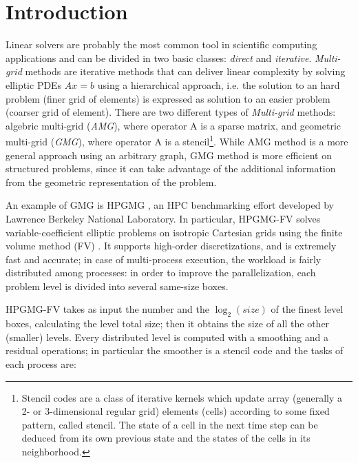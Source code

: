 \documentclass[review]{siamart1116}
\begin{document}
\section{Introduction}\label{sec:introduction}
Linear solvers are probably the most common tool in scientific computing applications and can be divided in two basic classes: \emph{direct} and \emph{iterative}.
\emph{Multi-grid} methods are iterative methods that can deliver linear complexity by solving elliptic PDEs $Ax=b$ using a hierarchical approach, i.e. the solution to an hard problem (finer grid of elements) is expressed as solution to an easier problem (coarser grid of element).
There are two different types of \emph{Multi-grid} methods: algebric multi-grid (\emph{AMG}), where operator A is a sparse matrix, and geometric multi-grid (\emph{GMG}), where operator A is a stencil\footnote{Stencil codes are a class of iterative kernels which update array (generally a 2- or 3-dimensional regular grid) elements (cells) according to some fixed pattern, called stencil. The state of a cell in the next time step can be deduced from its own previous state and the states of the cells in its neighborhood.
}. While AMG method is a more general approach using an arbitrary graph, GMG method is more efficient on structured problems, since it can take advantage of the additional information from the geometric representation of the problem.

An example of GMG is HPGMG \cite{HPGMG}, an HPC benchmarking effort developed by Lawrence Berkeley National Laboratory. In particular, HPGMG-FV solves variable-coefficient elliptic problems on isotropic Cartesian grids using the finite volume method (FV) \cite{finitevolume}.
It supports high-order discretizations, and is extremely fast and accurate; in case of multi-process execution, the workload is fairly distributed among processes: in order to improve the parallelization, each problem level is divided into several same-size boxes.


HPGMG-FV takes as input the number and the $\log_2 (size)$ of the finest level boxes, calculating the level
total size; then it obtains the size of all the other (smaller) levels. Every distributed level is computed with a smoothing and a residual operations; in particular the smoother is a stencil code and the tasks of each process are:
\end{document}
